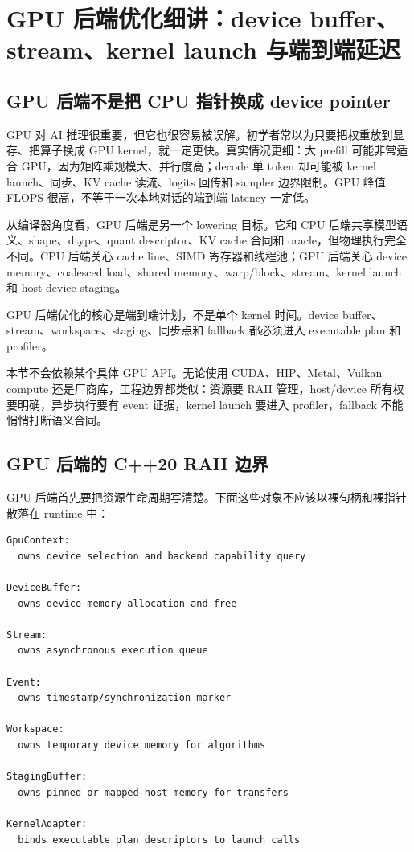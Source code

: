 \section{GPU 后端优化细讲：device buffer、stream、kernel launch 与端到端延迟}

\subsection{GPU 后端不是把 CPU 指针换成 device pointer}

GPU 对 AI 推理很重要，但它也很容易被误解。初学者常以为只要把权重放到显存、把算子换成 GPU kernel，就一定更快。真实情况更细：大 prefill 可能非常适合 GPU，因为矩阵乘规模大、并行度高；decode 单 token 却可能被 kernel launch、同步、KV cache 读流、logits 回传和 sampler 边界限制。GPU 峰值 FLOPS 很高，不等于一次本地对话的端到端 latency 一定低。

从编译器角度看，GPU 后端是另一个 lowering 目标。它和 CPU 后端共享模型语义、shape、dtype、quant descriptor、KV cache 合同和 oracle，但物理执行完全不同。CPU 后端关心 cache line、SIMD 寄存器和线程池；GPU 后端关心 device memory、coalesced load、shared memory、warp/block、stream、kernel launch 和 host-device staging。

\begin{keyidea}
GPU 后端优化的核心是端到端计划，不是单个 kernel 时间。device buffer、stream、workspace、staging、同步点和 fallback 都必须进入 executable plan 和 profiler。
\end{keyidea}

本节不会依赖某个具体 GPU API。无论使用 CUDA、HIP、Metal、Vulkan compute 还是厂商库，工程边界都类似：资源要 RAII 管理，host/device 所有权要明确，异步执行要有 event 证据，kernel launch 要进入 profiler，fallback 不能悄悄打断语义合同。

\subsection{GPU 后端的 C++20 RAII 边界}

GPU 后端首先要把资源生命周期写清楚。下面这些对象不应该以裸句柄和裸指针散落在 runtime 中：

\begin{lstlisting}[numbers=none,caption={GPU 后端 RAII 对象}]
GpuContext:
  owns device selection and backend capability query

DeviceBuffer:
  owns device memory allocation and free

Stream:
  owns asynchronous execution queue

Event:
  owns timestamp/synchronization marker

Workspace:
  owns temporary device memory for algorithms

StagingBuffer:
  owns pinned or mapped host memory for transfers

KernelAdapter:
  binds executable plan descriptors to launch calls
\end{lstlisting}

